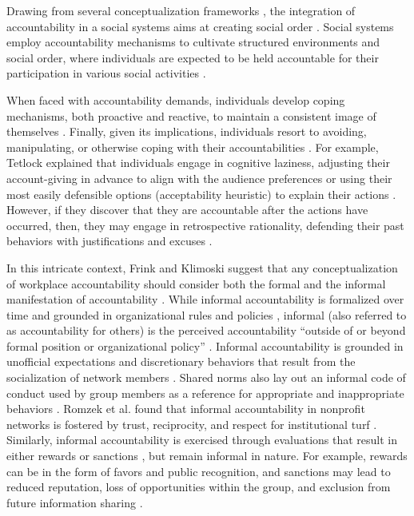 Drawing from several conceptualization frameworks \citep{frink1998toward,schlenker1994triangle,tetlock1992impact}, the integration of accountability in a social systems aims at creating social order \citep{hall2004leader}. Social systems employ accountability mechanisms to cultivate structured environments and social order, where individuals are expected to be held accountable for their participation in various social activities \citep{hall2017accountability}.

When faced with accountability demands, individuals develop coping mechanisms, both proactive and reactive, to maintain a consistent image of themselves \citep{schlenker1994triangle,hall2017accountability}. Finally, given its implications, individuals resort to avoiding, manipulating, or otherwise coping with their accountabilities \citep{tetlock1992impact,hall2017accountability}. For example, Tetlock explained that individuals engage in cognitive laziness, adjusting their account-giving in advance to align with the audience preferences or using their most easily defensible options (acceptability heuristic) to explain their actions \citep{tetlock1992impact}. However, if they discover that they are accountable after the actions have occurred, then, they may engage in retrospective rationality, defending their past behaviors with justifications and excuses \citep{lerner1999accounting}.

In this intricate context, Frink and Klimoski suggest that any conceptualization of workplace accountability should consider both the formal and the informal manifestation of accountability \citep{frink1998toward}. While informal accountability is formalized over time and grounded in organizational rules and policies \citep{frink2008meso}, informal (also referred to as accountability for others) is the perceived accountability ``outside of or beyond formal position or organizational policy'' \citep{zellars2011accountability}. Informal accountability is grounded in unofficial expectations and discretionary behaviors that result from the socialization of network members \citep{romzek2012preliminary}. Shared norms also lay out an informal code of conduct used by group members as a reference for appropriate and inappropriate behaviors \citep{romzek2012preliminary}. Romzek et al. found that informal accountability in nonprofit networks is fostered by trust, reciprocity, and respect for institutional turf \citep{romzek2012preliminary}. Similarly, informal accountability is exercised through evaluations that result in either rewards or sanctions \citep{romzek2014informal}, but remain informal in nature. For example, rewards can be in the form of favors and public recognition, and sanctions may lead to reduced reputation, loss of opportunities within the group, and exclusion from future information sharing \citep{romzek2014informal}.


